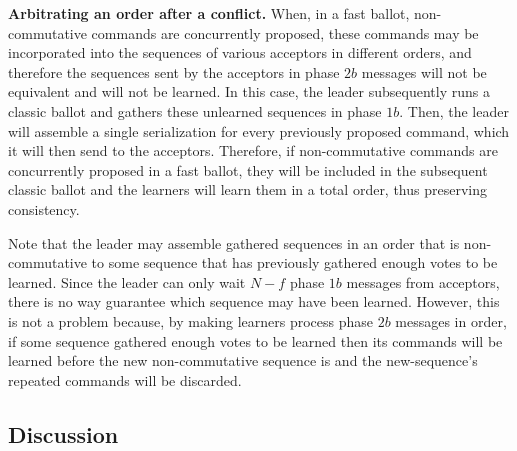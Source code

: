 \noindent \textbf{Arbitrating an order after a conflict.} When, in a fast ballot, non-commutative commands are  concurrently proposed, these commands may be incorporated into the sequences of various acceptors in different orders, and therefore the sequences sent by the acceptors in phase $2b$ messages will not be equivalent and will not be learned. In this case, the leader subsequently runs a classic ballot and gathers these unlearned sequences in phase $1b$. Then, the leader will assemble a single serialization for every previously proposed command, which it will then send to the acceptors. Therefore, if non-commutative commands are concurrently proposed in a fast ballot, they will be included in the subsequent classic ballot and the learners will learn them in a total order, thus preserving consistency. \par 
Note that the leader may assemble gathered sequences in an order that is non-commutative to some sequence that has previously gathered enough votes to be learned. Since the leader can only wait $N-f$ phase $1b$ messages from acceptors, there is no way guarantee which sequence may have been learned. However, this is not a problem because, by making learners process phase $2b$ messages in order, if some sequence gathered enough votes to be learned then its commands will be learned before the new non-commutative sequence is and the new-sequence's repeated commands will be discarded.\par

\subsection{Discussion}

